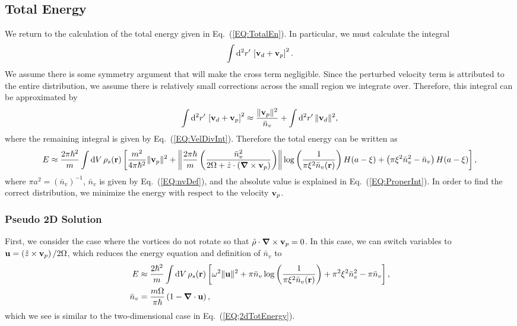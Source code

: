 \documentclass[onecolumn,nofootinbib,superscriptaddress]{revtex4}
\newcommand{\dd}[1]{\mathrm{d}#1\,}
\begin{document}
\subsection{Total Energy}

We return to the calculation of the total energy given in Eq.~(\ref{EQ:TotalEn}).  In particular, we must calculate the integral
\begin{equation}
\int \dd{^2 r'}\left[{\bf v}_d+{\bf v}_p\right]^2.
\end{equation}
We assume there is some symmetry argument that will make the cross term negligible.  Since the perturbed velocity term is attributed to the entire distribution, we assume there is relatively small corrections across the small region we integrate over.  Therefore, this integral can be approximated by
\begin{equation}
\int \dd{^2 r'}\left[{\bf v}_d+{\bf v}_p\right]^2 \approx \frac{\|{\bf v}_p\|^2}{\bar{n}_v} + \int \dd{^2 r'} \|{\bf v}_d\|^2,
\end{equation}
where the remaining integral is given by Eq.~(\ref{EQ:VelDivInt}).  Therefore the total energy can be written as
\begin{equation}
E \approx \frac{2\pi\hbar^2}{m}\int\dd{V}\rho_s({\bf r})\left[\frac{m^2}{4\pi \hbar^2}\|{\bf v}_p\|^2 + \left\|\frac{2\pi\hbar}{m}\left(\frac{\bar{n}_v^2}{2\Omega+\hat{z}\cdot\left({\boldsymbol \nabla}\times{\bf v}_p\right)}\right)\right\|\log\left(\frac{1}{\pi\xi^2 \bar{n}_v({\bf r})}\right) H(a - \xi) + \left( \pi \xi^2 \bar{n}_v^2 - \bar{n}_v \right) H(a - \xi) \right], \label{EQ:3dTotEn}
\end{equation}
where $\pi a^2 = (\bar{n}_v)^{-1}$, $\bar{n}_v$ is given by Eq.~(\ref{EQ:nvDef}), and the absolute value is explained in Eq.~(\ref{EQ:ProperInt}).  In order to find the correct distribution, we minimize the energy with respect to the velocity ${\bf v}_p$.

\subsubsection{Pseudo 2D Solution}

First, we consider the case where the vortices do not rotate so that $\hat{\rho}\cdot {\boldsymbol \nabla}\times {\bf v}_p = 0$.  In this case, we can switch variables to ${\bf u} = \left(\hat{z}\times {\bf v}_p\right)/2\Omega$, which reduces the energy equation and definition of $\bar{n}_v$ to
\begin{align}
E &\approx \frac{2\hbar^2}{m}\int \dd{V}\rho_s({\bf r})\left[\omega^2\|{\bf u}\|^2 + \pi\bar{n}_v\log\left(\frac{1}{\pi\xi^2 \bar{n}_v({\bf r})}\right) + \pi^2 \xi^2 \bar{n}_v^2 - \pi\bar{n}_v\right],\\
\bar{n}_v &= \frac{m\Omega}{\pi\hbar}\left(1-{\boldsymbol \nabla}\cdot{\bf u}\right),
\end{align}
which we see is similar to the two-dimensional case in Eq.~(\ref{EQ;2dTotEnergy}).
\end{document}
